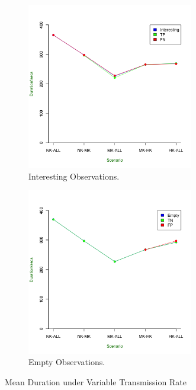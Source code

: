 \begin{figure}[ht!]
\centering
    \begin{subfigure}{0.7\textwidth}
	\includegraphics[width=0.8\textwidth]{Chap7/figures/real/all_int}
	\caption{Interesting Observations.}
	\label{fig:real:int:dur}
	\end{subfigure}	

	\begin{subfigure}{0.7\textwidth}
	\includegraphics[width=0.8\textwidth]{Chap7/figures/real/all_empty}
	\caption{Empty Observations.}
	\label{fig:real:empty:dur}
	\end{subfigure}	
\caption{Mean Duration under Variable Transmission Rate}
\end{figure}

